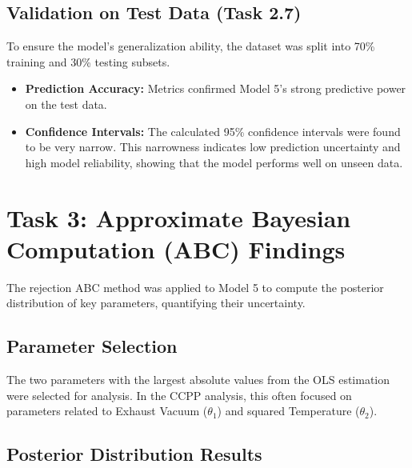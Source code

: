 \documentclass[12pt,a4paper]{article}
\begin{document}
\subsection{Validation on Test Data (Task 2.7)}

To ensure the model's generalization ability, the dataset was split into 70\% training and 30\% testing subsets.

\begin{itemize}
    \item \textbf{Prediction Accuracy:} Metrics confirmed Model 5's strong predictive power on the test data.
    \item \textbf{Confidence Intervals:} The calculated 95\% confidence intervals were found to be very narrow. This narrowness indicates low prediction uncertainty and high model reliability, showing that the model performs well on unseen data.
\end{itemize}

\section{Task 3: Approximate Bayesian Computation (ABC) Findings}

The rejection ABC method was applied to Model 5 to compute the posterior distribution of key parameters, quantifying their uncertainty.

\subsection{Parameter Selection}

The two parameters with the largest absolute values from the OLS estimation were selected for analysis. In the CCPP analysis, this often focused on parameters related to Exhaust Vacuum ($\theta_1$) and squared Temperature ($\theta_2$).

\subsection{Posterior Distribution Results}
\end{document}
